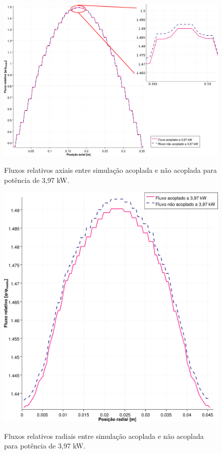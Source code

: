 \begin{figure}[htb]
  \caption{Fluxos relativos axiais entre simulação acoplada e não acoplada para
    potência de 3,97 kW.}
  \centering\includegraphics[scale=0.6]{figuras/Flux_rel_z_100_port_trabalhado.png}
  \label{fig:flux_z_100}
\end{figure}

\begin{figure}[htb]
  \caption{Fluxos relativos radiais entre simulação acoplada e não acoplada para
    potência de 3,97 kW.}
  \centering\includegraphics[scale=0.7]{figuras/Flux_rel_x_100_port.png}
  \label{fig:flux_x_100}
\end{figure}
